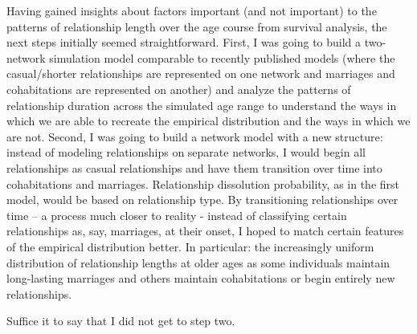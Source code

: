 \documentclass [11pt, proquest] {uwthesis}[2015/03/03]
\begin{document}
Having gained insights about factors important (and not important) to
the patterns of relationship length over the age course from survival
analysis, the next steps initially seemed straightforward. First, I was
going to build a two-network simulation model comparable to recently
published models (where the casual/shorter relationships are represented
on one network and marriages and cohabitations are represented on
another) and analyze the patterns of relationship duration across the
simulated age range to understand the ways in which we are able to
recreate the empirical distribution and the ways in which we are not.
Second, I was going to build a network model with a new structure:
instead of modeling relationships on separate networks, I would begin
all relationships as casual relationships and have them transition over
time into cohabitations and marriages. Relationship dissolution
probability, as in the first model, would be based on relationship type.
By transitioning relationships over time -- a process much closer to
reality - instead of classifying certain relationships as, say,
marriages, at their onset, I hoped to match certain features of the
empirical distribution better. In particular: the increasingly uniform
distribution of relationship lengths at older ages as some individuals
maintain long-lasting marriages and others maintain cohabitations or
begin entirely new relationships.

Suffice it to say that I did not get to step two.
\end{document}
